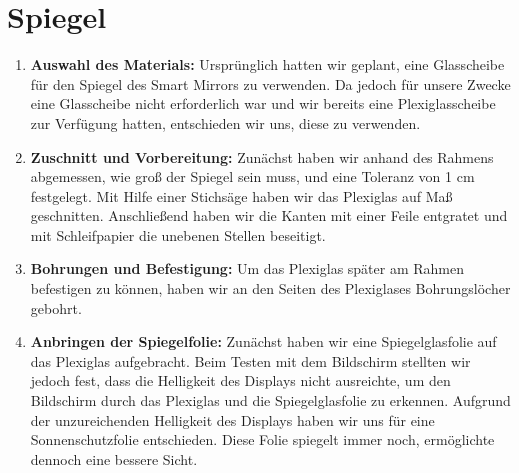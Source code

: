 \section{Spiegel}
\begin{enumerate}
    \item \textbf{Auswahl des Materials:}
Ursprünglich hatten wir geplant, eine Glasscheibe für den Spiegel des Smart Mirrors zu verwenden. Da jedoch für unsere Zwecke eine Glasscheibe nicht erforderlich war und wir bereits eine Plexiglasscheibe zur Verfügung hatten, entschieden wir uns, diese zu verwenden.

    \item \textbf{Zuschnitt und Vorbereitung:}
Zunächst haben wir anhand des Rahmens abgemessen, wie groß der Spiegel sein muss, und eine Toleranz von 1 cm festgelegt. Mit Hilfe einer Stichsäge haben wir das Plexiglas auf Maß geschnitten. Anschließend haben wir die Kanten mit einer Feile entgratet und mit Schleifpapier die unebenen Stellen beseitigt.
    
    \item \textbf{Bohrungen und Befestigung:}
Um das Plexiglas später am Rahmen befestigen zu können, haben wir an den Seiten des Plexiglases Bohrungslöcher gebohrt.
    
    \item \textbf{Anbringen der Spiegelfolie:}
    Zunächst haben wir eine Spiegelglasfolie auf das Plexiglas aufgebracht. Beim Testen mit dem Bildschirm stellten wir jedoch fest, dass die Helligkeit des Displays nicht ausreichte, um den Bildschirm durch das Plexiglas und die Spiegelglasfolie zu erkennen. Aufgrund der unzureichenden Helligkeit des Displays haben wir uns für eine Sonnenschutzfolie entschieden. Diese Folie spiegelt immer noch, ermöglichte dennoch eine bessere Sicht.

\end{enumerate}
